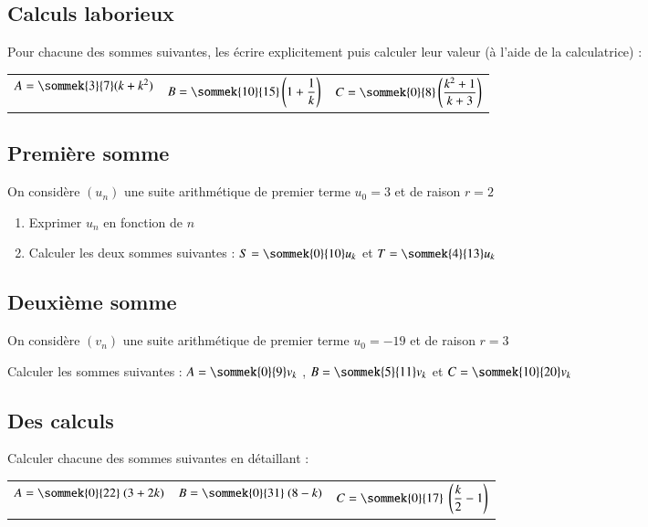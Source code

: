 \documentclass[oneside,12pt]{article}          %
\begin{document}
\subsection{Calculs laborieux}
Pour chacune des sommes suivantes, les écrire explicitement  puis calculer leur valeur (à l'aide de la calculatrice) :\\
\begin{tabular}{p{} p{} p{}}
	$A = \sommek{3}{7} (k + k^2)$ & $B = \sommek{10}{15} \left(1 + \dfrac{1}{k} \right)$ & $C = \sommek{0}{8} \left( \dfrac{k^2+1}{k+3} \right)$
\end{tabular}



\subsection{Première somme}
On considère $(u_n)$ une suite arithmétique de premier terme $u_0 = 3$ et de raison $r = 2$
\begin{enumerate}
	\item Exprimer $u_n$ en fonction de $n$
	\item Calculer les deux sommes suivantes : $S = \sommek{0}{10}u_k$ \quad et \quad $T = \sommek{4}{13}u_k$
\end{enumerate}



\subsection{Deuxième somme}
On considère $(v_n)$ une suite arithmétique de premier terme $u_0 = -19$ et de raison $r = 3$

Calculer les sommes suivantes : $A = \sommek{0}{9}v_k$ \quad , \quad $B = \sommek{5}{11}v_k$ \quad et \quad $C = \sommek{10}{20}v_k$



\subsection{Des calculs}
Calculer chacune des sommes suivantes en détaillant :\\
\renewcommand{\arraystretch}{2.2}
\begin{tabular}{p{} p{} p{}}
     $A = \sommek{0}{22}~(3+2k)$ & $B = \sommek{0}{31}~(8-k)$ & $C = \sommek{0}{17}~\left(\dfrac{k}{2}-1\right)$
\end{tabular}
\end{document}
